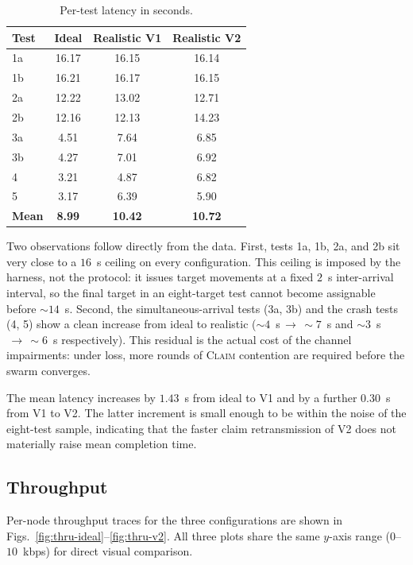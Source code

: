 \documentclass[11pt,letterpaper]{article}
\begin{document}
\begin{table}[h]
\centering
\caption{Per-test latency in seconds.}
\label{tab:lat}
\renewcommand{\arraystretch}{1.2}
\begin{tabular}{@{}l c c c@{}}
\toprule
\textbf{Test} & \textbf{Ideal} & \textbf{Realistic V1} & \textbf{Realistic V2} \\
\midrule
1a   & 16.17 & 16.15 & 16.14 \\
1b   & 16.21 & 16.17 & 16.15 \\
2a   & 12.22 & 13.02 & 12.71 \\
2b   & 12.16 & 12.13 & 14.23 \\
3a   &  4.51 &  7.64 &  6.85 \\
3b   &  4.27 &  7.01 &  6.92 \\
4    &  3.21 &  4.87 &  6.82 \\
5    &  3.17 &  6.39 &  5.90 \\
\midrule
\textbf{Mean} & \textbf{8.99} & \textbf{10.42} & \textbf{10.72} \\
\bottomrule
\end{tabular}
\end{table}

Two observations follow directly from the data. First, tests 1a, 1b,
2a, and 2b sit very close to a $16$~s ceiling on every configuration.
This ceiling is imposed by the harness, not the protocol: it issues
target movements at a fixed $2$~s inter-arrival interval, so the final
target in an eight-target test cannot become assignable before
$\sim\!14$~s. Second, the simultaneous-arrival tests (3a, 3b) and the
crash tests (4, 5) show a clean increase from ideal to realistic
($\sim\!4$~s$\,\to\,\sim\!7$~s and $\sim\!3$~s$\,\to\,\sim\!6$~s
respectively). This residual is the actual cost of the channel
impairments: under loss, more rounds of \textsc{Claim} contention are
required before the swarm converges.

The mean latency increases by $1.43$~s from ideal to V1 and by a
further $0.30$~s from V1 to V2. The latter increment is small enough
to be within the noise of the eight-test sample, indicating that the
faster claim retransmission of V2 does not materially raise mean
completion time.

\subsection{Throughput}
\label{sec:thru}

Per-node throughput traces for the three configurations are shown in
Figs.~\ref{fig:thru-ideal}--\ref{fig:thru-v2}. All three plots share
the same $y$-axis range ($0$--$10$~kbps) for direct visual comparison.
\end{document}
